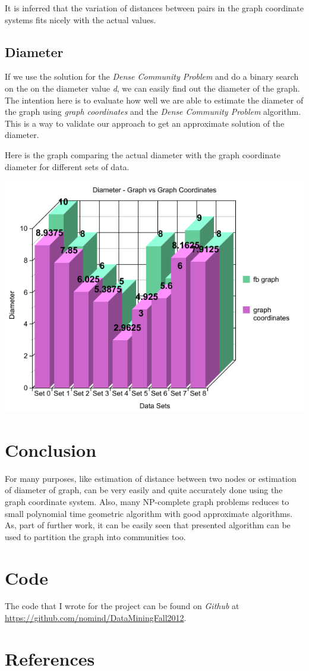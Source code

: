 \documentclass{article}
\begin{document}
            
            It is inferred that the variation of distances between pairs in the graph coordinate systems fits nicely with the actual values.
            
        \subsection{Diameter}
            
            If we use the solution for the {\em Dense Community Problem} and do a binary search on the on the diameter value {\em d}, we can easily find out the diameter of the graph. The intention here is to evaluate how well we are able to estimate the diameter of the graph using {\em graph coordinates} and the {\em Dense Community Problem} algorithm. This is a way to validate our approach to get an approximate solution of the diameter.
            
            Here is the graph comparing the actual diameter with the graph coordinate diameter for different sets of data.
            
            \includegraphics[scale=0.8]{diameter.png}
            
    \section{Conclusion}
    
        For many purposes, like estimation of distance between two nodes or estimation of diameter of graph, can be very easily and quite accurately done using the graph coordinate system. Also, many NP-complete graph problems reduces to small polynomial time geometric algorithm with good approximate algorithms. As, part of further work, it can be easily seen that presented algorithm can be used to partition the graph into communities too.
            
    \section{Code}
    
        The code that I wrote for the project can be found on {\em Github} at \url{https://github.com/nomind/DataMiningFall2012}.
        
    \section{References}
     
        \printbibliography
    
\end{document}
